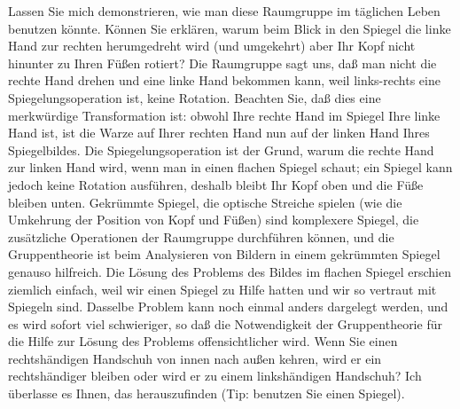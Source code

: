 Lassen Sie mich demonstrieren, wie man diese Raumgruppe im täglichen Leben benutzen könnte.
Können Sie erklären, warum beim Blick in den Spiegel die linke Hand zur rechten herumgedreht wird (und umgekehrt) aber Ihr Kopf nicht hinunter zu Ihren Füßen rotiert?
Die Raumgruppe sagt uns, daß man nicht die rechte Hand drehen und eine linke Hand bekommen kann, weil links-rechts eine Spiegelungsoperation ist, keine Rotation.
Beachten Sie, daß dies eine merkwürdige Transformation ist: obwohl Ihre rechte Hand im Spiegel Ihre linke Hand ist, ist die Warze auf Ihrer rechten Hand nun auf der linken Hand Ihres Spiegelbildes.
Die Spiegelungsoperation ist der Grund, warum die rechte Hand zur linken Hand wird, wenn man in einen flachen Spiegel schaut; ein Spiegel kann jedoch keine Rotation ausführen, deshalb bleibt Ihr Kopf oben und die Füße bleiben unten.
Gekrümmte Spiegel, die optische Streiche spielen (wie die Umkehrung der Position von Kopf und Füßen) sind komplexere Spiegel, die zusätzliche Operationen der Raumgruppe durchführen können, und die Gruppentheorie ist beim Analysieren von Bildern in einem gekrümmten Spiegel genauso hilfreich.
Die Lösung des Problems des Bildes im flachen Spiegel erschien ziemlich einfach, weil wir einen Spiegel zu Hilfe hatten und wir so vertraut mit Spiegeln sind.
Dasselbe Problem kann noch einmal anders dargelegt werden, und es wird sofort viel schwieriger, so daß die Notwendigkeit der Gruppentheorie für die Hilfe zur Lösung des Problems offensichtlicher wird.
Wenn Sie einen rechtshändigen Handschuh von innen nach außen kehren, wird er ein rechtshändiger bleiben oder wird er zu einem linkshändigen Handschuh?
Ich überlasse es Ihnen, das herauszufinden (Tip: benutzen Sie einen Spiegel).

